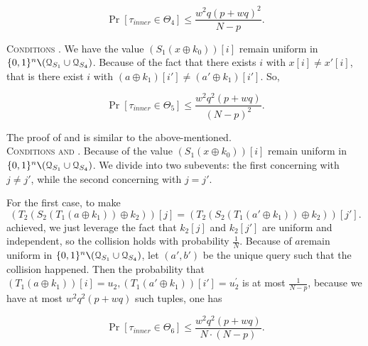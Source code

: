 $$
\operatorname{Pr}\left[\tau_{inner} \in \Theta_{4}\right] \leq \frac{w^{2} q (p+w q)^{2}}{N-p}.
$$

\noindent \textsc{Conditions \cfive}. We have the value $\left(S_{1}\left(x \oplus k_{0}\right)\right)[i]$ remain uniform in $\{0, 1\}^{n} \verb|\| (\mathcal{Q}_{S_{1}} \cup \mathcal{Q}_{S_{4}})$.  Because of the fact that there exists $i$ with $x[i]\neq x'[i]$, that is there exist $i$ with $\left(a \oplus k_{1}\right)[i'] \neq \left(a' \oplus k_{1}\right)[i']$. So,

$$
\operatorname{Pr}\left[\tau_{inner} \in \Theta_{5}\right] \leq \frac{w^{2} q^{2} (p+w q)}{(N-p)^2}.
$$

\noindent The proof of \cseven and \ceight is similar to the above-mentioned.\\

\noindent \textsc{Conditions \csix and \cnine}. Because of the value $\left(S_{1}\left(x \oplus k_{0}\right)\right)[i]$ remain uniform in $\{0, 1\}^{n} \verb|\| (\mathcal{Q}_{S_{1}} \cup \mathcal{Q}_{S_{4}})$. We divide \csix into two subevents: the first concerning with $j\neq j'$, while the second concerning with $j=j'$.

For the first case, to make 
$$
 \left(T_{2}\left(S_{2}\left(T_1\left(a \oplus k_{1}\right)\right) \oplus k_{2}\right)\right)[j] = \left(T_{2}\left(S_{2}\left(T_1\left(a' \oplus k_{1}\right)\right) \oplus k_{2}\right)\right)[j'].
$$
\noindent achieved, we just leverage the fact that $k_2[j]$ and $k_2[j']$ are uniform and independent, so the collision holds with probability $\frac{1}{N}$. Because of $a$remain uniform in $\{0, 1\}^{n} \verb|\| (\mathcal{Q}_{S_{1}} \cup \mathcal{Q}_{S_{4}})$, let $(a', b')$ be the unique query such that the collision happened. Then the probability that $\left(T_1\left(a \oplus k_{1}\right)\right)[i] = u_2, \left(T_1\left(a' \oplus k_{1}\right)\right)[i'] = u_2^{\prime}$ is at most $\frac{1}{N-p}$, because we have at most $w^2 q^2(p+ w q)$ such tuples, one has

$$
\operatorname{Pr}\left[\tau_{inner} \in \Theta_{6}\right] \leq \frac{w^{2} q^{2} (p+w q)}{N \cdot (N-p)}.
$$

